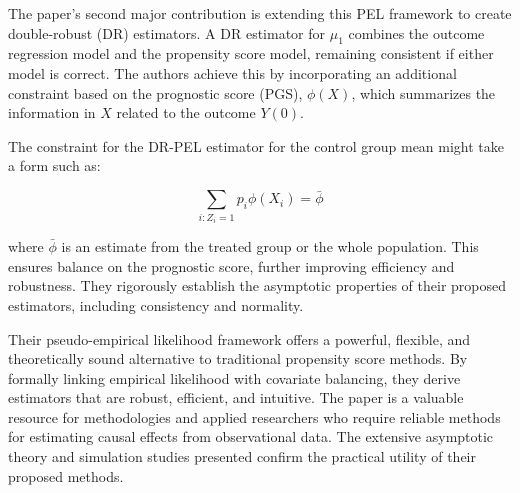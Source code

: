 \documentclass[11pt]{article}
\begin{document}
The paper's second major contribution is extending this PEL framework to create double-robust (DR) estimators. A DR estimator for $\mu_1$ combines the outcome regression model and the propensity score model, remaining consistent if either model is correct. The authors achieve this by incorporating an additional constraint based on the prognostic score (PGS), $\phi(X)$, which summarizes the information in $X$ related to the outcome $Y(0)$.

The constraint for the DR-PEL estimator for the control group mean might take a form such as:

$$
\sum_{i: Z_i = 1}p_i \phi(X_i) = \bar{\phi}
$$

where $\bar{\phi}$ is an estimate from the treated group or the whole population. This ensures balance on the prognostic score, further improving efficiency and robustness. They rigorously establish the asymptotic properties of their proposed estimators, including consistency and normality.

Their pseudo-empirical likelihood framework offers a powerful, flexible, and theoretically sound alternative to traditional propensity score methods. By formally linking empirical likelihood with covariate balancing, they derive estimators that are robust, efficient, and intuitive. The paper is a valuable resource for methodologies and applied researchers who require reliable methods for estimating causal effects from observational data. The extensive asymptotic theory and simulation studies presented confirm the practical utility of their proposed methods.
\end{document}
